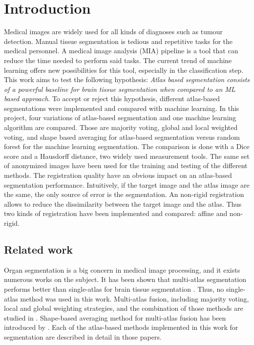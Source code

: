 \section*{Introduction}
Medical images are widely used for all kinds of diagnoses such as tumour detection. Manual tissue segmentation is tedious and repetitive tasks for the medical personnel. A medical image analysis (MIA) pipeline is a tool that can reduce the time needed to perform said tasks. The current trend of machine learning offers new possibilities for this tool, especially in the classification step.
This work aims to test the following hypothesis: \textit{Atlas based segmentation consists of a powerful baseline for brain tissue segmentation when compared to an ML based approach}. To accept or reject this hypothesis, different atlas-based segmentations were implemented and compared with machine learning.
In this project, four variations of atlas-based segmentation and one machine learning algorithm are compared. Those are majority voting, global and local weighted voting, and shape based averaging for atlas-based segmentation versus random forest for the machine learning segmentation. The comparison is done with a Dice score and a Hausdorff distance, two widely used measurement tools. The same set of anonymized images have been used for the training and testing of the different methods. The registration quality have an obvious impact on an atlas-based segmentation performance. Intuitively, if the target image and the atlas image are the same, the only source of error is the segmentation. An non-rigid registration allows to reduce the dissimilarity between the target image and the atlas. Thus two kinds of registration have been implemented and compared: affine and non-rigid.

\subsection*{Related work}
Organ segmentation is a big concern in medical image processing, and it exists numerous works on the subject. It has been shown that multi-atlas segmentation performs better than single-atlas for brain tissue segmentation \cite{Klein2005}. Thus, no single-atlas method was used in this work. Multi-atlas fusion, including majority voting, local and global weighting strategies, and the combination of those methods are studied in \cite{Artaechevarria2009}.
Shape-based averaging method for multi-atlas fusion has been introduced by \cite{Rohlfing2007}.
Each of the atlas-based methods implemented in this work for segmentation are described in detail in those papers.